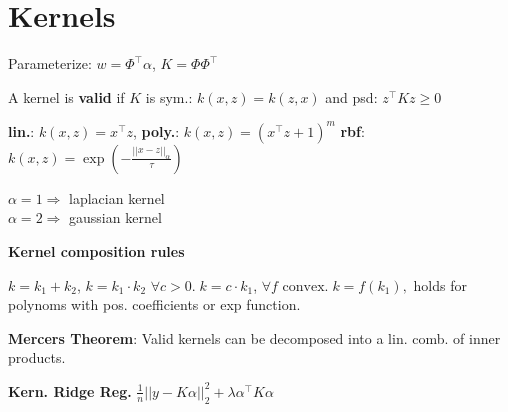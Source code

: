 \section*{Kernels}

Parameterize: $w = \Phi^\top \alpha$, $K = \Phi \Phi^\top$

A kernel is \textbf{valid} if $K$ is sym.: $k(x,z) = k(z,x)$ and psd: $z^\top K z \geq 0$

\textbf{lin.}: $k(x, z) = x^\top z$, \textbf{poly.}: $k(x, z) = (x^\top z + 1)^m$
\textbf{rbf}: $k(x, z) = \exp ( -\frac{||x - z||_\alpha}{\tau} )$

$\alpha = 1 \Rightarrow $ laplacian kernel \\
$\alpha = 2 \Rightarrow $ gaussian kernel

\textbf{Kernel composition rules}

$k = k_1 + k_2$, \quad $k = k_1 \cdot k_2$ \quad $\forall c > 0. \; k = c \cdot k_1$,
$\forall f \text{ convex}. \; k = f(k_1), $ holds for polynoms with pos. coefficients or exp function.

\textbf{Mercers Theorem}: Valid kernels can be decomposed into a lin. comb. of inner products.

\textbf{Kern. Ridge Reg.}
$\frac{1}{n} ||y - K\alpha ||_2^2 + \lambda \alpha^\top K \alpha$
